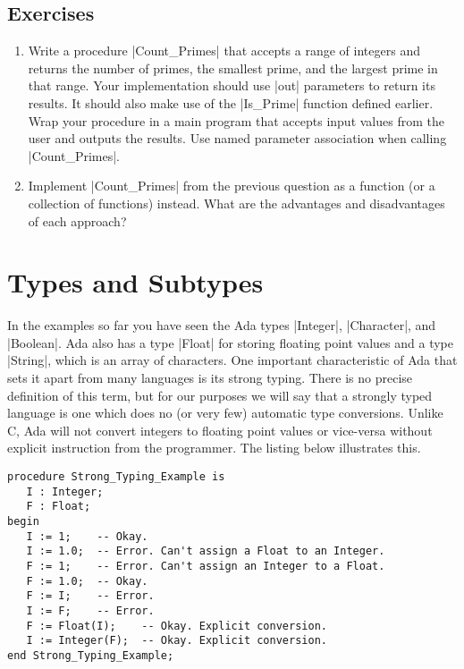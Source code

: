 \subsection*{Exercises}

\begin{enumerate}
\item Write a procedure |Count_Primes| that accepts a range of integers and returns the number
  of primes, the smallest prime, and the largest prime in that range. Your implementation should
  use |out| parameters to return its results. It should also make use of the |Is_Prime| function
  defined earlier. Wrap your procedure in a main program that accepts input values from the user
  and outputs the results. Use named parameter association when calling |Count_Primes|.

\item Implement |Count_Primes| from the previous question as a function (or a collection of
  functions) instead. What are the advantages and disadvantages of each approach?
\end{enumerate}

\section{Types and Subtypes}

In the examples so far you have seen the Ada types |Integer|, |Character|, and |Boolean|. Ada
also has a type |Float| for storing floating point values and a type |String|, which is an array
of characters. One important characteristic of Ada that sets it apart from many languages is its
strong typing. There is no precise definition of this term, but for our purposes we will say
that a strongly typed language is one which does no (or very few) automatic type conversions.
Unlike C, Ada will not convert integers to floating point values or vice-versa without explicit
instruction from the programmer. The listing below illustrates this.

\begin{lstlisting}
procedure Strong_Typing_Example is
   I : Integer;
   F : Float;
begin
   I := 1;    -- Okay.
   I := 1.0;  -- Error. Can't assign a Float to an Integer.
   F := 1;    -- Error. Can't assign an Integer to a Float.
   F := 1.0;  -- Okay.
   F := I;    -- Error.
   I := F;    -- Error.
   F := Float(I);    -- Okay. Explicit conversion.
   I := Integer(F);  -- Okay. Explicit conversion.
end Strong_Typing_Example;
\end{lstlisting}

